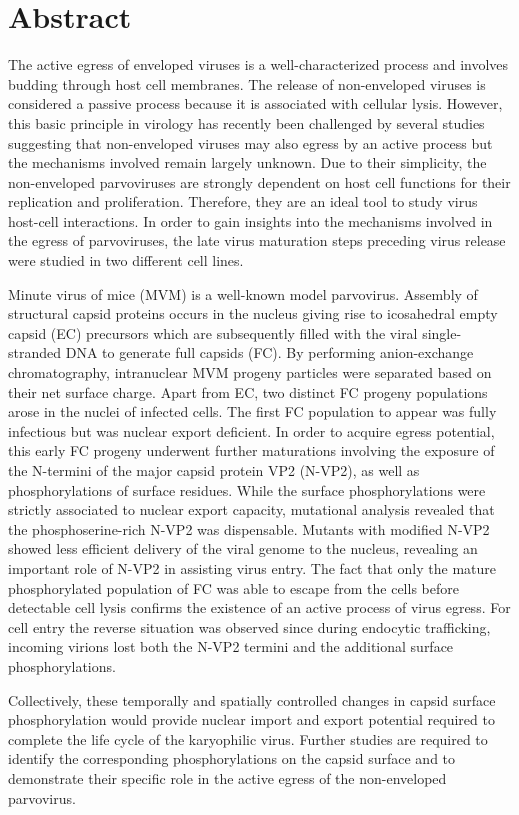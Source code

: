 

\chapter*{Abstract}


\label{Abstract} %


The active egress of enveloped viruses is a well-characterized process and involves budding through host cell membranes. The release of non-enveloped viruses is considered a passive process because it is associated with cellular lysis. However, this basic principle in virology has recently been challenged by several studies suggesting that non-enveloped viruses may also egress by an active process but the mechanisms involved remain largely unknown. Due to their simplicity, the non-enveloped parvoviruses are strongly dependent on host cell functions for their replication and proliferation. Therefore, they are an ideal tool to study virus host-cell interactions. In order to gain insights into the mechanisms involved in the egress of parvoviruses, the late virus maturation steps preceding virus release were studied in two different cell lines. 
	
\par
\medskip
Minute virus of mice (MVM) is a well-known model parvovirus. Assembly of structural capsid proteins occurs in the nucleus giving rise to icosahedral empty capsid (EC) precursors which are subsequently filled with the viral single-stranded DNA to generate full capsids (FC). By performing anion-exchange chromatography, intranuclear MVM progeny particles were separated based on their net surface charge. Apart from EC, two distinct FC progeny populations arose in the nuclei of infected cells. The first FC population to appear was fully infectious but was nuclear export deficient. In order to acquire egress potential, this early FC progeny underwent further maturations involving the exposure of the N-termini of the major capsid protein VP2 (N-VP2), as well as phosphorylations of surface residues. While the surface phosphorylations were strictly associated to nuclear export capacity, mutational analysis revealed that the phosphoserine-rich N-VP2 was dispensable. Mutants with modified N-VP2 showed less efficient delivery of the viral genome to the nucleus, revealing an important role of N-VP2 in assisting virus entry. The fact that only the mature phosphorylated population of FC was able to escape from the cells before detectable cell lysis confirms the existence of an active process of virus egress. For cell entry the reverse situation was observed since during endocytic trafficking, incoming virions lost both the N-VP2 termini and the additional surface phosphorylations. 
	
\par
\medskip
Collectively, these temporally and spatially controlled changes in capsid surface phosphorylation would provide nuclear import and export potential required to complete the life cycle of the karyophilic virus. Further studies are required to identify the corresponding phosphorylations on the capsid surface and to demonstrate their specific role in the active egress of the non-enveloped parvovirus. 